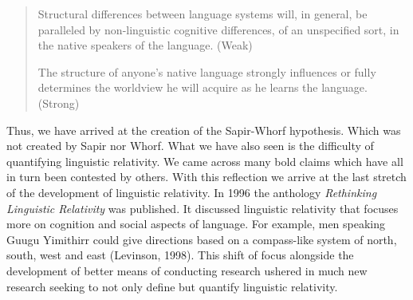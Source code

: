 \begin{quote}
\begin{singlespace}
{Structural differences between language systems will, in general, be paralleled by non-linguistic cognitive differences, of an unspecified sort, in the native speakers of the language.} (Weak) 

{The structure of anyone's native language strongly influences or fully determines the worldview he will acquire as he learns the language. (Strong)} 

\end{singlespace}

\end{quote}

Thus, we have arrived at the creation of the Sapir-Whorf hypothesis. Which was not created by Sapir nor Whorf. What we have also seen is the difficulty of quantifying linguistic relativity. We came across many bold claims which have all in turn been contested by others. With this reflection we arrive at the last stretch of the development of linguistic relativity. In 1996 the anthology \textit{Rethinking Linguistic Relativity} was published. It discussed linguistic relativity that focuses more on cognition and social aspects of language. For example, men speaking Guugu Yimithirr could give directions based on a compass-like system of north, south, west and east (Levinson, 1998). This shift of focus alongside the development of better means of conducting research ushered in much new research seeking to not only define but quantify linguistic relativity.  

